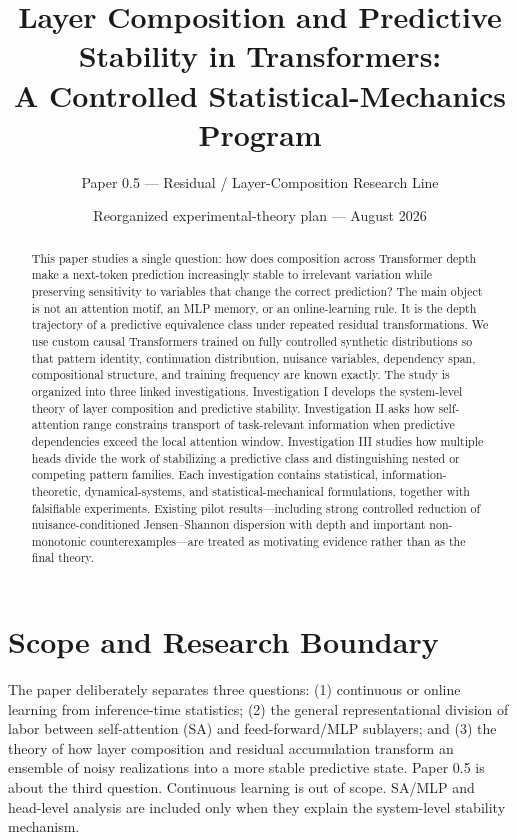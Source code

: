 \documentclass[10pt]{article}
\title{Layer Composition and Predictive Stability in Transformers:\\A Controlled Statistical-Mechanics Program}
\author{Paper 0.5 --- Residual / Layer-Composition Research Line}
\date{Reorganized experimental-theory plan --- August 2026}
\begin{document}
\maketitle
\begin{abstract}
This paper studies a single question: how does composition across Transformer depth make a next-token prediction increasingly stable to irrelevant variation while preserving sensitivity to variables that change the correct prediction? The main object is not an attention motif, an MLP memory, or an online-learning rule. It is the depth trajectory of a predictive equivalence class under repeated residual transformations. We use custom causal Transformers trained on fully controlled synthetic distributions so that pattern identity, continuation distribution, nuisance variables, dependency span, compositional structure, and training frequency are known exactly. The study is organized into three linked investigations. Investigation I develops the system-level theory of layer composition and predictive stability. Investigation II asks how self-attention range constrains transport of task-relevant information when predictive dependencies exceed the local attention window. Investigation III studies how multiple heads divide the work of stabilizing a predictive class and distinguishing nested or competing pattern families. Each investigation contains statistical, information-theoretic, dynamical-systems, and statistical-mechanical formulations, together with falsifiable experiments. Existing pilot results---including strong controlled reduction of nuisance-conditioned Jensen--Shannon dispersion with depth and important non-monotonic counterexamples---are treated as motivating evidence rather than as the final theory.
\end{abstract}
\section{Scope and Research Boundary}
The paper deliberately separates three questions: (1) continuous or online learning from inference-time statistics; (2) the general representational division of labor between self-attention (SA) and feed-forward/MLP sublayers; and (3) the theory of how layer composition and residual accumulation transform an ensemble of noisy realizations into a more stable predictive state. Paper 0.5 is about the third question. Continuous learning is out of scope. SA/MLP and head-level analysis are included only when they explain the system-level stability mechanism.
\end{document}
